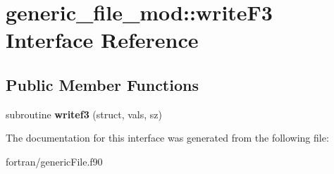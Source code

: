 \hypertarget{interfacegeneric__file__mod_1_1write_f3}{}\section{generic\+\_\+file\+\_\+mod\+:\+:write\+F3 Interface Reference}
\label{interfacegeneric__file__mod_1_1write_f3}
\subsection*{Public Member Functions}
\begin{DoxyCompactItemize}
\item 
\mbox{\label{interfacegeneric__file__mod_1_1write_f3_afdc3293e2bb1059f5f22de12d3088b89}} 
subroutine {\bfseries writef3} (struct, vals, sz)
\end{DoxyCompactItemize}


The documentation for this interface was generated from the following file\+:\begin{DoxyCompactItemize}
\item 
fortran/generic\+File.\+f90\end{DoxyCompactItemize}
